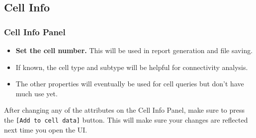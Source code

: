 \documentclass[11pt]{beamer}
\begin{document}
\subsection{Cell Info}
	\begin{frame}
		\frametitle{Cell Info Panel}
		\begin{itemize}
			\item \textbf{Set the cell number.} This will be used in report generation and file saving. 
			\item If known, the cell type and subtype will be helpful for connectivity analysis.
			\item The other properties will eventually be used for cell queries but don't have much use yet.
		\end{itemize}
			After changing any of the attributes on the Cell Info Panel, make sure to press the \texttt{[Add to cell data]} button. This will make sure your changes are reflected next time you open the UI.\\
	\end{frame}
\end{document}
